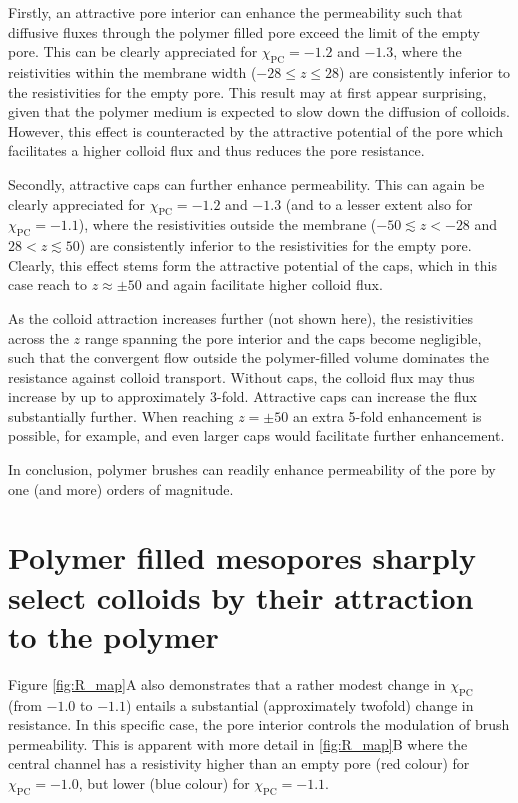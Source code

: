 \documentclass[12pt, a4paper]{article}
\begin{document}
Firstly, an attractive pore interior can enhance the permeability such that diffusive fluxes through the polymer filled pore exceed the limit of the empty pore.
This can be clearly appreciated for $\chi_{\text{PC}}=-1.2$ and $-1.3$, 
where the reistivities within the membrane width  ($-28\le z\le 28$) are consistently inferior to the resistivities for the empty pore.
This result may at first appear surprising, given that the polymer medium is expected to slow down the diffusion of colloids.
However, this effect is counteracted by the attractive potential of the pore which facilitates a higher colloid flux and thus reduces the pore resistance.

Secondly, attractive caps can further enhance permeability.
This can again be clearly appreciated for $\chi_{\text{PC}}=-1.2$ and $-1.3$ (and to a lesser extent also for $\chi_{\text{PC}}=-1.1$), 
where the resistivities outside the membrane ($-50 \lesssim z<-28$ and $28<z \lesssim 50$) are consistently inferior to the resistivities for the empty pore. 
Clearly, this effect stems form the attractive potential of the caps, which in this case reach to $z \approx \pm 50$ and again facilitate higher colloid flux. 

As the colloid attraction increases further (not shown here), the resistivities across the $z$ range spanning the pore interior and the caps become negligible, 
such that the convergent flow outside the polymer-filled volume dominates the resistance against colloid transport.
Without caps, the colloid flux may thus increase by up to approximately 3-fold. 
Attractive caps can increase the flux substantially further.
When reaching $z=\pm 50$ an extra 5-fold enhancement is possible, for example, and even larger caps would facilitate further enhancement.

In conclusion, polymer brushes can readily enhance permeability of the pore by one (and more) orders of magnitude.


\section{Polymer filled mesopores sharply select colloids by their attraction to the polymer}

Figure \ref{fig:R_map}A also demonstrates that a rather modest change in $\chi_{\text{PC}}$ (from $-1.0$ to $-1.1$) entails a substantial (approximately twofold) change in resistance. 
In this specific case, the pore interior controls the modulation of brush permeability. 
This is apparent with more detail in \ref{fig:R_map}B where the central channel has a resistivity higher than an empty pore (red colour) for $\chi_{\text{PC}}=-1.0$, 
but lower (blue colour) for $\chi_{\text{PC}}=-1.1$. 
\end{document}
